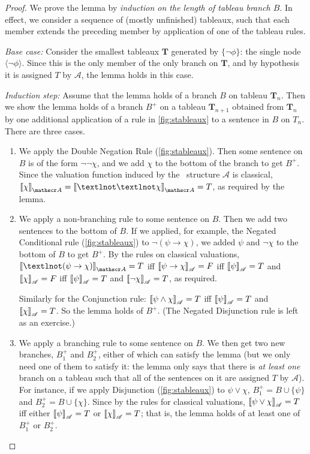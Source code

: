 \begin{proof} We prove the lemma by {\em induction on the length of tableau branch $B$}. In effect, we consider a sequence of (mostly unfinished) tableaux, such that each member extends the preceding member by application of one of the tableau rules.

\emph{Base case:} Consider the smallest tableaux $\mathbf{T}$ generated by $\{\neg\phi\}$: the single node $\langle\neg\phi\rangle$. Since this is the only member of the only branch on $\mathbf{T}$, and by hypothesis it is assigned $T$ by $\mathscr{A}$, the lemma holds in this case.

 \emph{Induction step:} Assume that the lemma holds of a branch 
 $B$ on tableau $\mathbf{T}_{n}$. Then we show the lemma holds of a branch $B^{+}$ on a tableau $\mathbf{T}_{n+1}$ obtained from $\mathbf{T}_{n}$ by one additional application of a rule in \autoref{fig:stableaux} to a sentence in $B$ on $T_{n}$. There are three cases.
    \begin{enumerate}
	\item We apply the Double Negation Rule (\autoref{fig:stableaux}). Then some sentence on $B$ is of the form $\neg\neg\chi$, and we add $\chi$ to the bottom of the branch to get $B^{+}$. Since the valuation function induced by the \lone\ structure $\mathscr{A}$ is classical, $\val{\chi}{A} = \val{¬¬\chi}{A} = T$, as required by the lemma.
	\item We apply a non-branching rule to some sentence  on $B$. Then we add two sentences to the bottom of $B$. If we applied, for example, the Negated Conditional rule (\autoref{fig:stableaux}) to $\neg(\psi \to \chi)$, we added $\psi$ and $\neg\chi$ to the bottom of $B$ to get $B^{+}$. By the rules on classical valuations, $\val{¬(\psi\to\chi)}{A} = T$ iff $\left\llbracket \psi \to \chi\right\rrbracket_{\mathscr{A}} = F$ iff $\left\llbracket \psi\right\rrbracket_{\mathscr{A}} = T$ and $\left\llbracket \chi\right\rrbracket_{\mathscr{A}} = F$ iff $\left\llbracket \psi\right\rrbracket_{\mathscr{A}} = T$ and $\left\llbracket \neg\chi\right\rrbracket_{\mathscr{A}} = T$, as required. 

	Similarly for the Conjunction rule: $\left\llbracket \psi\wedge\chi\right\rrbracket_{\mathscr{A}} = T$ iff $\left\llbracket \psi\right\rrbracket_{\mathscr{A}} = T$ and $\left\llbracket \chi\right\rrbracket_{\mathscr{A}} = T$. So the lemma holds of $B^{+}$. (The Negated Disjunction rule is left as an exercise.)

	\item We apply a branching rule to some sentence on $B$. We then get two new branches, $B^{+}_{1}$ and $B^{+}_{2}$, either of which can satisfy the lemma (but we only need one of them to satisfy it: the lemma only says that there is \emph{at least one} branch on a tableau such that all of the sentences on it are assigned $T$ by $\mathscr{A}$). For instance, if we apply Disjunction (\autoref{fig:stableaux}) to $\psi \vee \chi$, $B^{+}_{1} = B \cup \{\psi\}$ and $B^{+}_{2} = B \cup \{\chi\}$. Since by the rules for classical valuations, $\left\llbracket \psi\vee\chi\right\rrbracket_{\mathscr{A}} = T$ iff either $\left\llbracket \psi\right\rrbracket_{\mathscr{A}} = T$ or $\left\llbracket \chi\right\rrbracket_{\mathscr{A}} = T$; that is, the lemma holds of at least one of $B^{+}_{1}$ or $B^{+}_{2}$.


\end{enumerate}
\end{proof}
